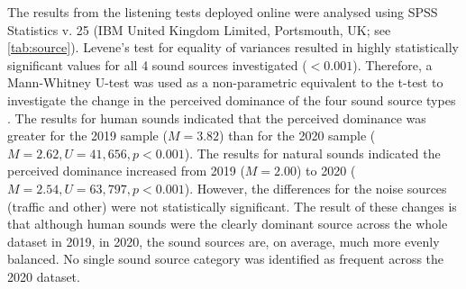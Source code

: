    The results from the listening tests deployed online were analysed using SPSS Statistics v. 25 (IBM United Kingdom Limited, Portsmouth, UK; see \cref{tab:source}). Levene's test for equality of variances resulted in highly statistically significant values for all 4 sound sources investigated ($<0.001$). Therefore, a Mann-Whitney U-test was used as a non-parametric equivalent to the t-test to investigate the change in the perceived dominance of the four sound source types \citep{McKnight2010Mann}. The results for human sounds indicated that the perceived dominance was greater for the 2019 sample ($M=3.82$) than for the 2020 sample ($M=2.62, U=41,656, p<0.001$). The results for natural sounds indicated the perceived dominance increased from 2019 ($M=2.00$) to 2020 ($M=2.54, U=63,797, p<0.001$). However, the differences for the noise sources (traffic and other) were not statistically significant. The result of these changes is that although human sounds were the clearly dominant source across the whole dataset in 2019, in 2020, the sound sources are, on average, much more evenly balanced. No single sound source category was identified as frequent across the 2020 dataset.


